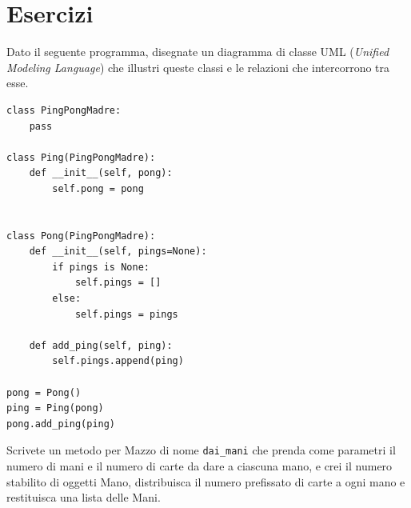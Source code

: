 \documentclass[10pt]{book}
\begin{document}
\newpage
\section{Esercizi}

\begin{exercise}
Dato il seguente programma, disegnate un diagramma di classe UML ({\em Unified Modeling Language}) che illustri queste classi e le relazioni che intercorrono tra esse.

\begin{verbatim}
class PingPongMadre:
    pass

class Ping(PingPongMadre):
    def __init__(self, pong):
        self.pong = pong


class Pong(PingPongMadre):
    def __init__(self, pings=None):
        if pings is None:
            self.pings = []
        else:
            self.pings = pings

    def add_ping(self, ping):
        self.pings.append(ping)

pong = Pong()
ping = Ping(pong)
pong.add_ping(ping)
\end{verbatim}


\end{exercise}

\vspace{0.2in}
\begin{exercise}

Scrivete un metodo per Mazzo di nome \verb"dai_mani" che prenda come parametri il numero di mani e il numero di carte da dare a ciascuna mano, e crei il numero stabilito di oggetti Mano, distribuisca il numero prefissato di carte a ogni mano e restituisca una lista delle Mani.

\end{exercise}
\end{document}
